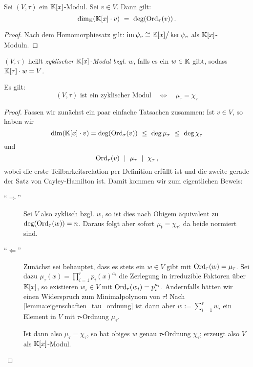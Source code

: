 \begin{lemma}
  \label{lemma:modul_dim_deg}
  Sei $(V,\tau)$ ein $\mathbb{K}[x]$-Modul. Sei $v\in V$. Dann gilt:
  \[ \dim_\mathbb{K}( \mathbb{K}[x]\cdot v ) \ =\  \deg( \operatorname{Ord}_\tau(v) )\,.\]
\end{lemma}
\begin{proof}
  Nach dem Homomorphiesatz gilt: 
  $ \operatorname{im}\psi_v \cong \mathbb{K}[x] \big/ \ker \psi_v$ als $\mathbb{K}[x]$-Moduln.
\end{proof}


\begin{definition}
  $(V,\tau)$ heißt \emph{zyklischer $\mathbb{K}[x]$-Modul bzgl. $w$}, falls es ein 
  $w\in \mathbb{K}$ gibt, sodass $\mathbb{K}[\tau]\cdot w = V$.
\end{definition}


\begin{satz}
  Es gilt:
  \[ (V,\tau) \text{ ist ein zyklischer Modul} \quad\Leftrightarrow\quad
    \mu_\tau = \chi_\tau\]
\end{satz}
\begin{proof}
  Fassen wir zunächst ein paar einfache Tatsachen zusammen:
  Ist $v \in V$, so haben wir 
  \[ \dim(\mathbb{K}[x]\cdot v) = \deg( \operatorname{Ord}_\tau(v) ) \ \leq\  
    \deg\mu_\tau \ \leq\  \deg \chi_\tau \]
  und 
  \[ \operatorname{Ord}_\tau (v) \ \mid\  \mu_\tau \ \mid\  \chi_\tau \,,\]
  wobei die erste Teilbarkeitsrelation per Definition erfüllt ist und die
  zweite gerade der Satz von Cayley-Hamilton ist.
  Damit kommen wir zum eigentlichen Beweis:
  \begin{description}
    \item["`$\Rightarrow$"'] Sei $V$ also zyklisch bzgl. $w$, so ist dies nach
      Obigem äquivalent zu $\deg(\operatorname{Ord}_\tau(w)) = n$. Daraus folgt aber sofort
      $\mu_t = \chi_\tau$, da beide normiert sind.
    \item["`$\Leftarrow$"'] Zunächst sei behauptet, dass es stets ein 
      $w \in V$ gibt mit $\operatorname{Ord}_\tau(w) = \mu_\tau$. Sei dazu 
      $\mu_\tau(x) = \prod_{i=1}^r p_i(x)^{a_i}$ die Zerlegung in irreduzible
      Faktoren über $\mathbb{K}[x]$, so existieren $w_i \in V$ mit
      $\operatorname{Ord}_\tau(w_i) = p_i^{a_i}$. Andernfalls hätten wir einen Widerspruch 
      zum Minimalpolynom von $\tau$!
      Nach \autoref{lemma:eigenschaften_tau_ordnung} ist dann aber 
      $w := \sum_{i=1}^r w_i$ ein Element in $V$ mit $\tau$-Ordnung $\mu_\tau$.

      Ist dann also $\mu_\tau = \chi_\tau$, so hat obiges $w$ genau
      $\tau$-Ordnung $\chi_\tau$; erzeugt also $V$ als $\mathbb{K}[x]$-Modul.
  \end{description}
\end{proof}


